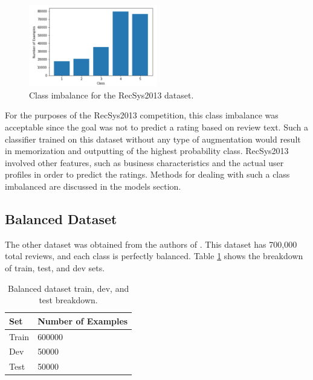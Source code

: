 \begin{figure}[H]
	\includegraphics[width=0.5\textwidth]{images/recsys_balance.png}
	\caption{Class imbalance for the RecSys2013 dataset.}
\end{figure}

For the purposes of the RecSys2013 competition, this class imbalance was acceptable since the goal was not to predict a rating based on review text. Such a classifier trained on this dataset without any type of augmentation would result in memorization and outputting of the highest probability class. RecSys2013 involved other features, such as business characteristics and the actual user profiles in order to predict the ratings. Methods for dealing with such a class imbalanced are discussed in the models section.

\subsection{Balanced Dataset}
The other dataset was obtained from the authors of \cite{coneau_schwenk_lecun_barrault}. This dataset has 700,000 total reviews, and each class is perfectly balanced. Table \ref{tab:balancedbreakdown} shows the breakdown of train, test, and dev sets.
\begin{table}[H]
	\begin{tabular}{@{}ll@{}}
		\toprule
		\textbf{Set} & \textbf{Number of Examples} \\ \midrule
		Train        & 600000                      \\
		Dev          & 50000                       \\
		Test         & 50000                       \\ \bottomrule
	\end{tabular}
	\caption{\label{tab:balancedbreakdown}Balanced dataset train, dev, and test breakdown.}
\end{table}


